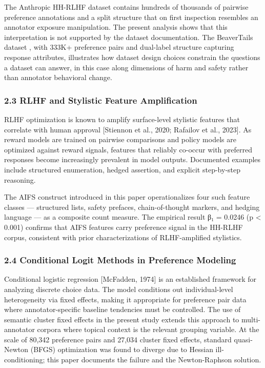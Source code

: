The Anthropic HH-RLHF dataset \citep{Baietal2022} contains hundreds of thousands of pairwise preference annotations and a split structure that on first inspection resembles an annotator exposure manipulation. The present analysis shows that this interpretation is not supported by the dataset documentation. The BeaverTails dataset \citep{Jietal2023}, with 333K+ preference pairs and dual-label structure capturing response attributes, illustrates how dataset design choices constrain the questions a dataset can answer, in this case along dimensions of harm and safety rather than annotator behavioral change.

\subsubsection{2.3 RLHF and Stylistic Feature Amplification}

RLHF optimization is known to amplify surface-level stylistic features that correlate with human approval [Stiennon et al., 2020; Rafailov et al., 2023]. As reward models are trained on pairwise comparisons and policy models are optimized against reward signals, features that reliably co-occur with preferred responses become increasingly prevalent in model outputs. Documented examples include structured enumeration, hedged assertion, and explicit step-by-step reasoning.

The AIFS construct introduced in this paper operationalizes four such feature classes — structured lists, safety prefaces, chain-of-thought markers, and hedging language — as a composite count measure. The empirical result β₁ = 0.0246 (p < 0.001) confirms that AIFS features carry preference signal in the HH-RLHF corpus, consistent with prior characterizations of RLHF-amplified stylistics.

\subsubsection{2.4 Conditional Logit Methods in Preference Modeling}

Conditional logistic regression [McFadden, 1974] is an established framework for analyzing discrete choice data. The model conditions out individual-level heterogeneity via fixed effects, making it appropriate for preference pair data where annotator-specific baseline tendencies must be controlled. The use of semantic cluster fixed effects in the present study extends this approach to multi-annotator corpora where topical context is the relevant grouping variable. At the scale of 80,342 preference pairs and 27,034 cluster fixed effects, standard quasi-Newton (BFGS) optimization was found to diverge due to Hessian ill-conditioning; this paper documents the failure and the Newton-Raphson solution.


